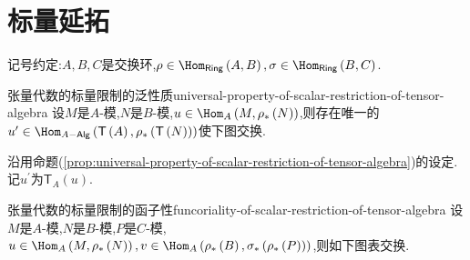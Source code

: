 \section{标量延拓}

记号约定:$A,B,C$是交换环,$\rho\in\Hom_{\mathsf{Ring}}\left(A,B\right),\sigma\in\Hom_{\mathsf{Ring}}\left(B,C\right)$.

\begin{proposition}{张量代数的标量限制的泛性质}{universal-property-of-scalar-restriction-of-tensor-algebra}
	设$M$是$A$-模,$N$是$B$-模,$u\in\Hom_{A}\left(M,\rho_{\ast}\left(N\right)\right)$,则存在唯一的$u^{\prime}\in\Hom_{A-\mathsf{Alg}}\left(\mathsf{T}\left(A\right),\rho_{\ast}\left(\mathsf{T}\left(N\right)\right)\right)$使下图交换.
	\begin{center}
	\end{center}
\end{proposition}

\begin{definition}{}{}
	沿用命题(\ref{prop:universal-property-of-scalar-restriction-of-tensor-algebra})的设定.记$u^{\prime}$为$\mathsf{T}_{A}\left(u\right)$.
\end{definition}

\begin{proposition}{张量代数的标量限制的函子性}{funcoriality-of-scalar-restriction-of-tensor-algebra}
	设$M$是$A$-模,$N$是$B$-模,$P$是$C$-模,$u\in\Hom_{A}\left(M,\rho_{\ast}\left(N\right)\right),v\in\Hom_{A}\left(\rho_{\ast}\left(B\right),\sigma_{\ast}\left(\rho_{\ast}\left(P\right)\right)\right)$,则如下图表交换.
	\begin{center}
	\end{center}
\end{proposition}

